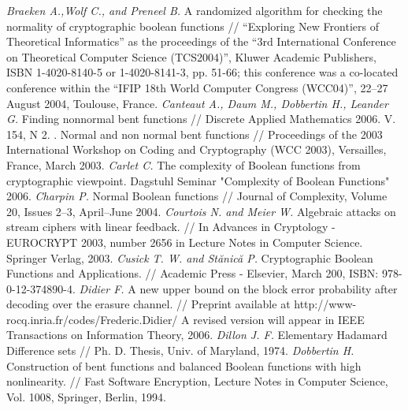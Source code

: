 \begin{thebibliography}{99}
 {\it Braeken A.,Wolf C., and Preneel B.} A randomized algorithm for checking the normality of cryptographic boolean functions // “Exploring New Frontiers of Theoretical Informatics” as the proceedings of the “3rd International Conference on Theoretical Computer Science (TCS2004)”, Kluwer Academic Publishers, ISBN 1-4020-8140-5 or 1-4020-8141-3, pp. 51-66; this conference was a co-located conference within the “IFIP 18th World Computer Congress (WCC04)”, 22–27 August 2004, Toulouse, France.
 {\it Canteaut A., Daum M., Dobbertin H., Leander G.} Finding nonnormal bent functions // Discrete Applied Mathematics 2006. V. 154, N 2.
. Normal and non normal bent functions // Proceedings of the 2003 International Workshop on Coding and Cryptography (WCC 2003), Versailles, France, March 2003.
 {\it Carlet C.} The complexity of Boolean functions from cryptographic viewpoint. Dagstuhl Seminar "Complexity of Boolean Functions" 2006.
 {\it Charpin P.} Normal Boolean functions // Journal of Complexity, Volume 20, Issues 2–3, April–June 2004.
 {\it Courtois N. and Meier W.} Algebraic attacks on stream ciphers with linear feedback. // In Advances in Cryptology - EUROCRYPT 2003, number 2656 in Lecture Notes in Computer Science. Springer Verlag,  2003.
 {\it Cusick T. W. and Stănică P.} Cryptographic Boolean Functions and Applications. // Academic Press - Elsevier, March 200, ISBN: 978-0-12-374890-4.
 {\it Didier F.} A new upper bound on the block error probability after decoding over the erasure channel. // Preprint available at http://www-rocq.inria.fr/codes/Frederic.Didier/ A revised version will appear in IEEE Transactions on Information Theory, 2006.
 {\it Dillon J. F.} Elementary Hadamard Difference sets // Ph. D. Thesis, Univ. of Maryland, 1974.
 {\it Dobbertin H.} Construction of bent functions and balanced Boolean functions with high nonlinearity. // Fast Software Encryption, Lecture Notes in Computer Science, Vol. 1008, Springer, Berlin, 1994.

\end{thebibliography}
